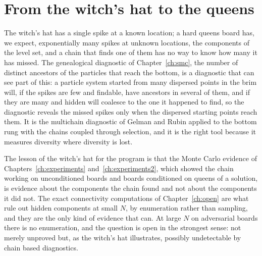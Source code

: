 \section{From the witch's hat to the queens}

The witch's hat has a single spike at a known location; a hard queens board has, we expect, exponentially many spikes at unknown locations, the components of the level set, and a chain that finds one of them has no way to know how many it has missed. The genealogical diagnostic of Chapter~\ref{ch:smc}, the number of distinct ancestors of the particles that reach the bottom, is a diagnostic that can see part of this: a particle system started from many dispersed points in the brim will, if the spikes are few and findable, have ancestors in several of them, and if they are many and hidden will coalesce to the one it happened to find, so the diagnostic reveals the missed spikes only when the dispersed starting points reach them. It is the multichain diagnostic of Gelman and Rubin applied to the bottom rung with the chains coupled through selection, and it is the right tool because it measures diversity where diversity is lost.

The lesson of the witch's hat for the program is that the Monte Carlo evidence of Chapters~\ref{ch:experiments} and~\ref{ch:experiments2}, which showed the chain working on unconditioned boards and boards conditioned on queens of a solution, is evidence about the components the chain found and not about the components it did not. The exact connectivity computations of Chapter~\ref{ch:open} are what rule out hidden components at small $N$, by enumeration rather than sampling, and they are the only kind of evidence that can. At large $N$ on adversarial boards there is no enumeration, and the question is open in the strongest sense: not merely unproved but, as the witch's hat illustrates, possibly undetectable by chain based diagnostics.

